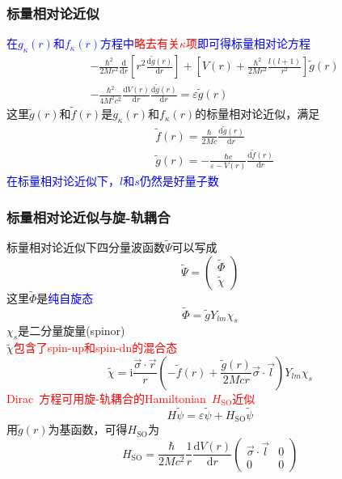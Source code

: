 \documentclass[cjk,slidestop,compress,mathserif,blue]{beamer}
\begin{document}
\frame
{
	\frametitle{标量相对论近似}
	\textcolor{blue}{在$g_{\kappa}(r)$和$f_{\kappa}(r)$方程中}\textcolor{red}{略去有关$\kappa$项}\textcolor{blue}{即可得标量相对论方程}
	\begin{displaymath}
		\begin{aligned}
			&-\frac{\hbar^2}{2Mr^2}\frac{\mathrm{d}}{\mathrm{d}r}\left[ r^2\frac{\mathrm{d}\tilde{g}(r)}{\mathrm{d}r} \right]+\left[ V(r)+\frac{\hbar^2}{2Mr^2}\frac{l(l+1)}{r^2} \right]\tilde{g}(r)\\
			&-\frac{\hbar^2}{4M^2c^2}\frac{\mathrm{d}V(r)}{\mathrm{d}r}\frac{\mathrm{d}\tilde{g}(r)}{\mathrm{d}r}=\varepsilon\tilde{g}(r)
		\end{aligned}
	\end{displaymath}
	这里$\tilde g(r)$和$\tilde f(r)$是$g_{\kappa}(r)$和$f_{\kappa}(r)$的标量相对论近似，满足
	\begin{displaymath}
		\begin{aligned}
			&\tilde{f}(r)=\frac{\hbar}{2Mc}\frac{\mathrm{d}\tilde{g}(r)}{\mathrm{d}r}\\
			&\tilde{g}(r)=-\frac{\hbar c}{\varepsilon-V(r)}\frac{\mathrm{d}\tilde{f}(r)}{\mathrm{d}r}
		\end{aligned}
	\end{displaymath}
	\textcolor{blue}{在标量相对论近似下，$l$和$s$仍然是好量子数}
}

\frame
{
	\frametitle{标量相对论近似与旋-轨耦合}
	标量相对论近似下四分量波函数$\tilde\Psi$可以写成
	\begin{displaymath}
		\tilde\Psi=\left( 
		\begin{matrix}
			\tilde\Phi\\
			\tilde\chi
		\end{matrix}
		\right)
	\end{displaymath}
	这里$\tilde\Phi$是\textcolor{blue}{纯自旋态}$$\tilde\Phi=\tilde gY_{lm}\chi_s$$
	$\chi_s$是二分量旋量(\textrm{spinor})\\
	$\tilde\chi$\textcolor{red}{包含了\textrm{spin-up}和\textrm{spin-dn}的混合态}
	\begin{displaymath}
		\tilde\chi=\mathrm{i}\frac{\vec{\sigma}\cdot\vec r}r\left( -\tilde{f}(r)+\frac{\tilde{g}(r)}{2Mcr}\vec{\sigma}\cdot\vec l \right)Y_{lm}\chi_s
	\end{displaymath}
	\textcolor{red}{\textrm{Dirac~}方程可用旋-轨耦合的\textrm{Hamiltonian~}$H_{\mathrm{SO}}$近似}
	$$H\tilde{\psi}=\varepsilon\tilde{\psi}+H_{\mathrm{SO}}\tilde{\psi}$$
	用$\tilde{g}(r)$为基函数，可得$H_{\mathrm{SO}}$为
	\begin{displaymath}
		H_{\mathrm{SO}}=\frac{\hbar}{2Mc^2}\frac1r\frac{\mathrm{d}V(r)}{\mathrm{d}r}\left( 
		\begin{matrix}
			\vec{\sigma}\cdot\vec l &0\\
			0 &0
		\end{matrix}
		\right)
	\end{displaymath}
}
\end{document}
